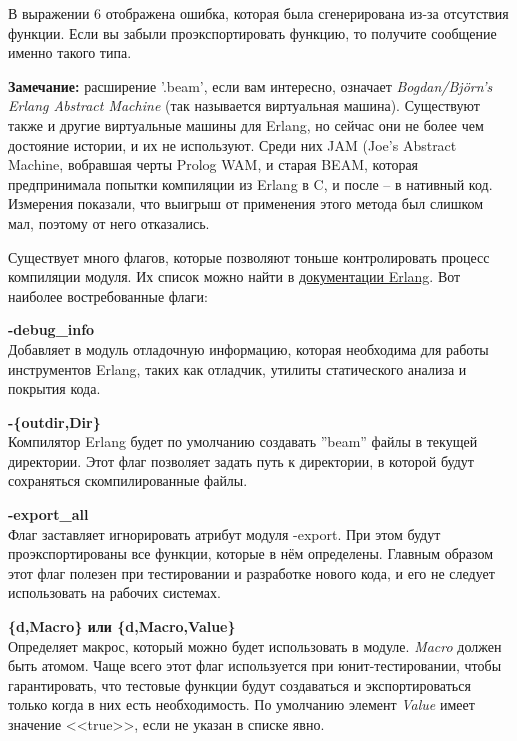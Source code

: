\documentclass[a4paper,12pt]{report}
\newcommand{\ops}{\colorbox{lgreen}}
\begin{document}
В выражении 6 отображена ошибка, которая была сгенерирована из\--за отсутствия функции. Если вы забыли проэкспортировать функцию, то получите сообщение именно такого типа.\\ 
\colorbox{lgray}
{
    \begin{minipage}{1\linewidth}
        \textbf{Замечание:} расширение '.beam', если вам интересно, означает \emph{Bogdan/Björn's Erlang Abstract Machine} (так называется виртуальная машина). Существуют также и другие виртуальные машины для Erlang, но сейчас они не более чем достояние истории, и их не используют. Среди них JAM (Joe's Abstract Machine, вобравшая черты Prolog WAM, и старая BEAM, которая предпринимала попытки компиляции из Erlang в C, и после \--- в нативный код. Измерения показали, что выигрыш от применения этого метода был слишком мал, поэтому от него отказались.
    \end{minipage}
}

Существует много флагов, которые позволяют тоньше контролировать процесс компиляции модуля. Их список можно найти в \href{http://erlang.org/doc/man/compile.html}{документации Erlang}. Вот наиболее востребованные флаги:\\ 

\begin{minipage}{0.9\linewidth}
    \textbf{-debug\_info}\\ 
    Добавляет в модуль отладочную информацию, которая необходима для работы инструментов Erlang, таких как отладчик, утилиты статического анализа и покрытия кода.
\end{minipage}

\begin{minipage}{0.9\linewidth}
    \textbf{-\{outdir,Dir\}}\\ 
    Компилятор Erlang будет по умолчанию создавать ''beam'' файлы в текущей директории. Этот флаг позволяет задать путь к директории, в которой будут сохраняться скомпилированные файлы.
\end{minipage}

\begin{minipage}{0.9\linewidth}
    \textbf{-export\_all}\\ 
    Флаг заставляет игнорировать атрибут модуля \ops{-export}. При этом будут проэкспортированы все функции, которые в нём определены. Главным образом этот флаг полезен при тестировании и разработке нового кода, и его не следует использовать на рабочих системах.
\end{minipage}

\begin{minipage}{0.9\linewidth}
    \textbf{\{d,Macro\} или \{d,Macro,Value\}}\\ 
    Определяет макрос, который можно будет использовать в модуле. \emph{Macro} должен быть атомом. Чаще всего этот флаг используется при юнит\--тестировании, чтобы гарантировать, что тестовые функции будут создаваться и экспортироваться только когда в них есть необходимость. По умолчанию элемент \emph{Value} имеет значение <<true>>, если не указан в списке явно.
\end{minipage}
\end{document}
